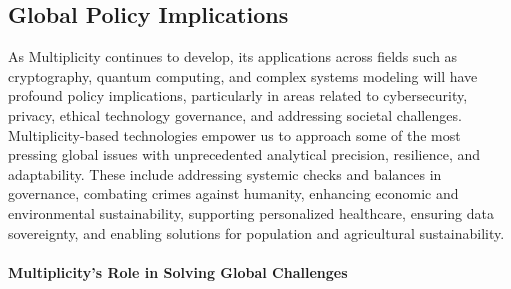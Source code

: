 \documentclass{article}
\theoremstyle{plain}
\begin{document}
\begin{enumerate}
\subsection{Global Policy Implications}

As Multiplicity continues to develop, its applications across fields such as cryptography, quantum computing, and complex systems modeling will have profound policy implications, particularly in areas related to cybersecurity, privacy, ethical technology governance, and addressing societal challenges. Multiplicity-based technologies empower us to approach some of the most pressing global issues with unprecedented analytical precision, resilience, and adaptability. These include addressing systemic checks and balances in governance, combating crimes against humanity, enhancing economic and environmental sustainability, supporting personalized healthcare, ensuring data sovereignty, and enabling solutions for population and agricultural sustainability.

\paragraph{Multiplicity's Role in Solving Global Challenges}


\end{enumerate}
\end{document}
